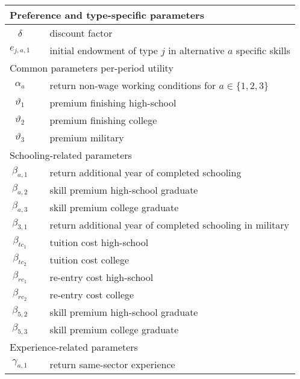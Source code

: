 \begin{ThreePartTable}
\begin{longtable}{@{}cll@{}}
\midrule
\multicolumn{3}{l}{Preference and type-specific parameters}																		 \\ \midrule 
$\delta$ 				&  & discount factor																			  \\
$e_{j, a ,1}$			&  & initial endowment of type $j$ in alternative $a$ specific skills 	  \\ [7.5pt] \midrule 
\multicolumn{3}{l}{Common parameters per-period utility}												\\ \midrule 
$\alpha_a$           &  & return non-wage working conditions for $a \in \{1 ,2 ,3 \}$		   \\
$\vartheta_1$        &  & premium finishing high-school                 								    \\
$\vartheta_2$        &  & premium finishing college															    \\
$\vartheta_3$        &  & premium military                              											  \\[7.5pt] \midrule 
\multicolumn{3}{l}{Schooling-related parameters}															   \\ \midrule
$\beta_{a,1}$        &  & return additional year of completed schooling 							   \\
$\beta_{a,2}$        &  & skill premium high-school graduate            									\\
$\beta_{a,3}$        &  & skill premium college graduate													   	\\
$\beta_{3,1}$        &  & return additional year of completed schooling in military					\\
$\beta_{tc_1}$       &  & tuition cost high-school                      											\\
$\beta_{tc_2}$       &  & tuition cost college                          												\\
$\beta_{rc_1}$       &  & re-entry cost high-school                     										   \\
$\beta_{rc_2}$       &  & re-entry cost college                        												   \\
$\beta_{5,2}$        &  & skill premium high-school graduate            									\\
$\beta_{5,3}$        &  & skill premium college graduate                									     \\ [7.5pt] \midrule
\multicolumn{3}{l}{Experience-related parameters}           													 \\
\midrule 
$\gamma_{a,1}$       &  & return same-sector experience                 									 \\

\end{longtable}
\end{ThreePartTable}
